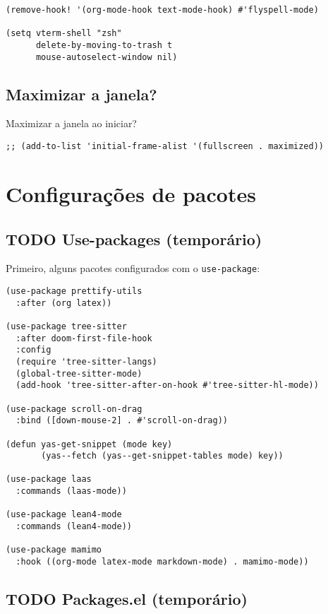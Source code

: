 \documentclass[11pt]{article}
\begin{document}
\begin{verbatim}
(remove-hook! '(org-mode-hook text-mode-hook) #'flyspell-mode)

(setq vterm-shell "zsh"
      delete-by-moving-to-trash t
      mouse-autoselect-window nil)
\end{verbatim}

\subsection{Maximizar a janela?}
\label{sec:org548ce9e}

Maximizar a janela ao iniciar?

\begin{verbatim}
;; (add-to-list 'initial-frame-alist '(fullscreen . maximized))
\end{verbatim}

\section{Configurações de pacotes}
\label{sec:orgaf2d49b}
\subsection{{\bfseries\sffamily TODO} Use-packages (temporário)}
\label{sec:orgfc51f71}

Primeiro, alguns pacotes configurados com o \texttt{use-package}:

\begin{verbatim}
(use-package prettify-utils
  :after (org latex))

(use-package tree-sitter
  :after doom-first-file-hook
  :config
  (require 'tree-sitter-langs)
  (global-tree-sitter-mode)
  (add-hook 'tree-sitter-after-on-hook #'tree-sitter-hl-mode))

(use-package scroll-on-drag
  :bind ([down-mouse-2] . #'scroll-on-drag))

(defun yas-get-snippet (mode key)
       (yas--fetch (yas--get-snippet-tables mode) key))

(use-package laas
  :commands (laas-mode))

(use-package lean4-mode
  :commands (lean4-mode))

(use-package mamimo
  :hook ((org-mode latex-mode markdown-mode) . mamimo-mode))
\end{verbatim}

\subsection{{\bfseries\sffamily TODO} Packages.el (temporário)}
\label{sec:org917055a}
\end{document}

